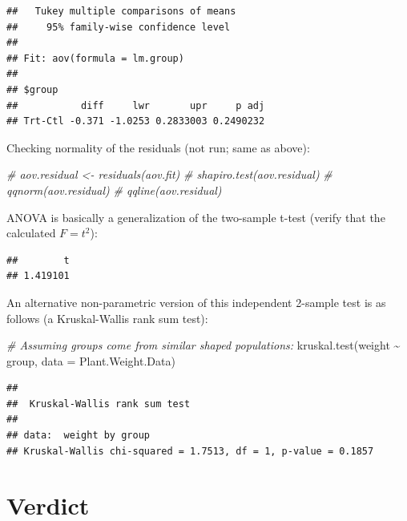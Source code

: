 \documentclass[
]{book}
\newenvironment{Shaded}{\begin{snugshade}}{\end{snugshade}}
\newcommand{\AttributeTok}[1]{\textcolor[rgb]{0.77,0.63,0.00}{#1}}
\newcommand{\CommentTok}[1]{\textcolor[rgb]{0.56,0.35,0.01}{\textit{#1}}}
\newcommand{\DecValTok}[1]{\textcolor[rgb]{0.00,0.00,0.81}{#1}}
\newcommand{\FunctionTok}[1]{\textcolor[rgb]{0.00,0.00,0.00}{#1}}
\newcommand{\NormalTok}[1]{#1}
\newcommand{\SpecialCharTok}[1]{\textcolor[rgb]{0.00,0.00,0.00}{#1}}
\begin{document}
\begin{verbatim}
##   Tukey multiple comparisons of means
##     95% family-wise confidence level
## 
## Fit: aov(formula = lm.group)
## 
## $group
##           diff     lwr       upr     p adj
## Trt-Ctl -0.371 -1.0253 0.2833003 0.2490232
\end{verbatim}

Checking normality of the residuals (not run; same as above):

\begin{Shaded}
\begin{Highlighting}[]
\CommentTok{\# aov.residual \textless{}{-} residuals(aov.fit)}
\CommentTok{\# shapiro.test(aov.residual)}
\CommentTok{\# qqnorm(aov.residual)}
\CommentTok{\# qqline(aov.residual)}
\end{Highlighting}
\end{Shaded}

ANOVA is basically a generalization of the two-sample t-test (verify that the calculated \(F = t^2\)):

\begin{Shaded}
\end{Shaded}

\begin{verbatim}
##        t 
## 1.419101
\end{verbatim}

An alternative non-parametric version of this independent 2-sample test is as follows (a Kruskal-Wallis rank sum test):

\begin{Shaded}
\begin{Highlighting}[]
\CommentTok{\# Assuming groups come from similar shaped populations:}
\FunctionTok{kruskal.test}\NormalTok{(weight }\SpecialCharTok{\textasciitilde{}}\NormalTok{ group, }\AttributeTok{data =}\NormalTok{ Plant.Weight.Data) }
\end{Highlighting}
\end{Shaded}

\begin{verbatim}
## 
##  Kruskal-Wallis rank sum test
## 
## data:  weight by group
## Kruskal-Wallis chi-squared = 1.7513, df = 1, p-value = 0.1857
\end{verbatim}

\hypertarget{verdict}{%
\section{Verdict}\label{verdict}}
\end{document}
